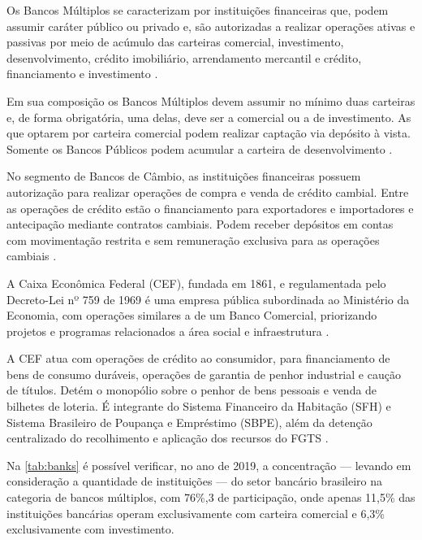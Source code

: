 \documentclass[12pt,12pt,openright,oneside,a4paper,chapter=TITLE,section=TITLE,subsection=TITLE,subsubsection=TITLE,english,french,spanish,portugues,sumario=tradicional]{abntex2}
\begin{document}
Os Bancos Múltiplos se caracterizam por instituições financeiras que, podem
assumir caráter público ou privado e, são autorizadas a realizar operações
ativas e passivas por meio de acúmulo das carteiras comercial, investimento,
desenvolvimento, crédito imobiliário, arrendamento mercantil e crédito, financiamento e investimento \cite{Res:2099:1994}.

Em sua composição os Bancos Múltiplos devem assumir no mínimo duas carteiras e,
de forma obrigatória, uma delas, deve ser a comercial ou a de investimento. As
que optarem por carteira comercial podem realizar captação via depósito à vista. Somente os Bancos Públicos podem acumular a carteira de desenvolvimento
\cite{Res:2099:1994}.

No segmento de Bancos de Câmbio, as instituições financeiras possuem autorização para realizar operações de compra e venda de crédito cambial. Entre as operações de crédito estão o financiamento para exportadores e importadores e antecipação mediante contratos cambiais. Podem receber depósitos em contas com movimentação restrita e sem remuneração exclusiva para as operações cambiais \cite{Res:3426:2006}.

A Caixa Econômica Federal (CEF), fundada em 1861, e regulamentada pelo
Decreto-Lei nº 759 de 1969 é uma empresa pública subordinada ao Ministério da
Economia, com operações similares a de um Banco Comercial, priorizando projetos
e programas relacionados a área social e infraestrutura \cite{DL:759:1969}.

A CEF atua com operações de crédito ao consumidor, para financiamento de bens
de consumo duráveis, operações de garantia de penhor industrial e caução de
títulos. Detém o monopólio sobre o penhor de bens pessoais e venda de bilhetes
de loteria. É integrante do Sistema Financeiro da Habitação (SFH) e Sistema
Brasileiro de Poupança e Empréstimo (SBPE), além da detenção centralizado do
recolhimento e aplicação dos recursos do FGTS \cite{DL:759:1969}.

Na \autoref{tab:banks} é possível verificar, no ano de 2019, a concentração --- levando em consideração a quantidade de instituições --- do setor bancário brasileiro na categoria de bancos múltiplos, com 76\%,3 de participação, onde apenas 11,5\% das instituições bancárias operam exclusivamente com carteira comercial e 6,3\% exclusivamente com investimento.
\end{document}
